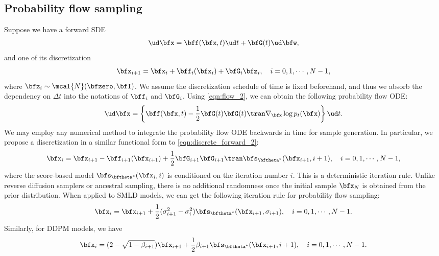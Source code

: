 \subsection{Probability flow sampling}\label{app:prob_flow_sampling}
Suppose we have a forward SDE
\begin{align*}
    \ud \bfx = \bff(\bfx, t) \ud t + \bfG(t) \ud \bfw,
\end{align*}
and one of its discretization
\begin{align}
    \bfx_{i+1} = \bfx_i + \bff_i(\bfx_i) + \bfG_i \bfz_i, \quad i = 0, 1, \cdots, N-1, \label{eqn:discrete_forward_2}
\end{align}
where $\bfz_i \sim \mcal{N}(\bfzero, \bfI)$. We assume the discretization schedule of time is fixed beforehand, and thus we absorb the dependency on $\Delta t$ into the notations of $\bff_i$ and $\bfG_i$. Using \cref{eqn:flow_2}, we can obtain the following probability flow ODE:
\begin{align}
    \ud \bfx = \left\{ \bff(\bfx, t) - \frac{1}{2}\bfG(t)\bfG(t)\tran \nabla_\bfx \log p_t(\bfx) \right\} \ud t.
\end{align}
We may employ any numerical method to integrate the probability flow ODE backwards in time for sample generation. In particular, we propose a discretization in a similar functional form to \cref{eqn:discrete_forward_2}:
\begin{align*}
    \bfx_i = \bfx_{i+1} - \bff_{i+1}(\bfx_{i+1}) + \frac{1}{2}\bfG_{i+1}\bfG_{i+1}\tran \bfs_{\bftheta^*}(\bfx_{i+1}, i+1),\quad  i =0,1,\cdots, N-1,
\end{align*}
where the score-based model $\bfs_{\bftheta^*}(\bfx_i, i)$ is conditioned on the iteration number $i$. This is a deterministic iteration rule. Unlike reverse diffusion samplers or ancestral sampling, there is no additional randomness once the initial sample $\bfx_N$ is obtained from the prior distribution. When applied to SMLD models, we can get the following iteration rule for probability flow sampling:
\begin{align}
    \bfx_i = \bfx_{i+1} + \frac{1}{2} (\sigma_{i+1}^2 - \sigma_i^2) \bfs_{{\bftheta^*}}(\bfx_{i+1}, \sigma_{i+1}), \quad i=0,1,\cdots, N-1.
\end{align}
Similarly, for DDPM models, we have
\begin{align}
    \bfx_i = (2 - \sqrt{1 -\beta_{i+1}})\bfx_{i+1} + \frac{1}{2} \beta_{i+1} \bfs_{\bftheta^*}(\bfx_{i+1}, i+1), \quad i=0,1,\cdots, N-1.
\end{align}


